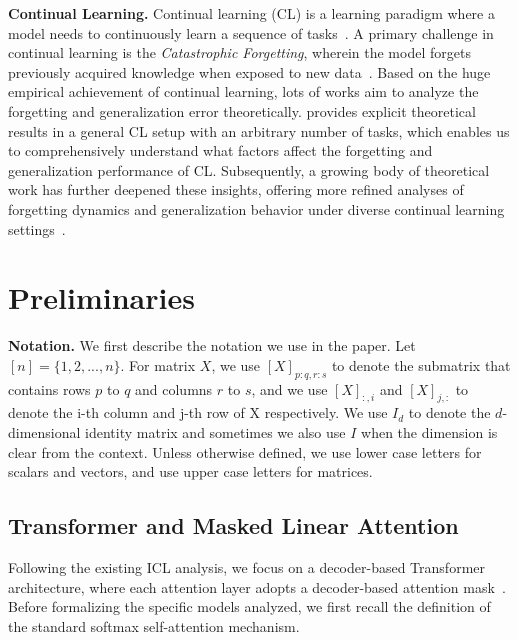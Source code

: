 \documentclass{article}
\theoremstyle{plain}
\theoremstyle{definition}
\theoremstyle{remark}
\begin{document}
\noindent \textbf{Continual Learning.}
Continual learning (CL) is a learning paradigm where a model needs to continuously learn a sequence of tasks~\cite{shi2025survey,zheng2025survey}. A primary challenge in continual learning is the \textit{Catastrophic Forgetting}, wherein the model forgets previously acquired knowledge when exposed to new data~\cite{liu2022continual,pmlr-v80-serra18a,jin_gradient-based_2021,momeni-etal-2025-context,irie2025metalearning}. Based on the huge empirical achievement of continual learning, lots of works aim to analyze the forgetting and generalization error theoretically. \citet{pmlr-v202-lin23f} provides explicit theoretical results in a general CL setup with an arbitrary number of tasks, which enables us to comprehensively understand what factors affect the forgetting and generalization performance of CL. Subsequently, a growing body of theoretical work has further deepened these insights, offering more refined analyses of forgetting dynamics and generalization behavior under diverse continual learning settings~\cite{pmlr-v178-evron22a,pmlr-v235-ding24c,li2025towards,li2025optimal,irie2025metalearning}.

\vspace{-0.1in}\section{Preliminaries}
\textbf{Notation.}
We first describe the notation we use in the paper. Let $[n] = \{1, 2, ..., n\}.$ For matrix $X$, we use $[X]_{p:q,r:s}$ to denote the submatrix that contains rows $p$ to $q$ and columns $r$ to $s$, and we use $[X]_{:,i}$ and $[X]_{j,:}$ to denote the i-th column and j-th row of X respectively. We use $I_d$ to denote the $d$-dimensional identity matrix and sometimes we also use $I$ when the dimension is clear from the context. Unless otherwise defined, we use lower case letters for scalars and vectors, and use upper case letters for matrices.

\subsection{Transformer and Masked Linear Attention}
\label{lsa}
Following the existing ICL analysis, we focus on a decoder-based Transformer architecture, where each attention layer adopts a decoder-based attention mask~\cite{bai2023transformers,ahn2023transformers,pmlr-v202-von-oswald23a,zhang_context_2024,wu_how_2024,duraisamy2024finitesampleanalysisbounds,zhang2026benign}. Before formalizing the specific models analyzed, we first recall the definition of the standard softmax self-attention mechanism.
\end{document}
